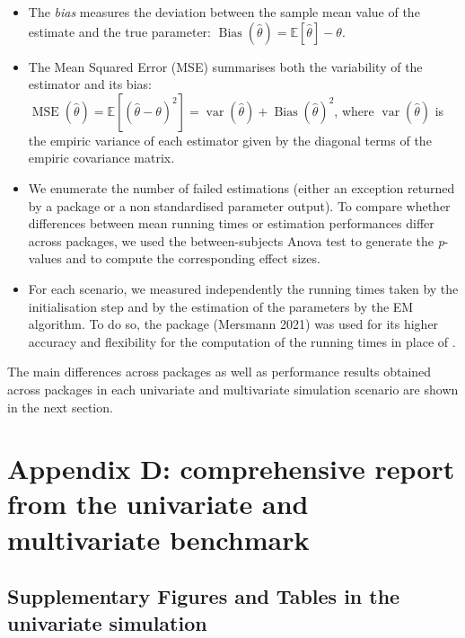 \begin{itemize}
\item
  The \emph{bias} measures the deviation between the sample mean value of the
  estimate and the true parameter:
  \(\operatorname{Bias}(\hat{\theta})=\mathbb{E} [\hat{\theta}] - \theta\).
\item
  The Mean Squared Error (MSE) summarises both the variability of the
  estimator and its bias: \(\operatorname{MSE} (\hat{\theta})=\mathbb{E} \left[ (\hat{\theta} - \theta)^2 \right] = \operatorname{var}(\hat{\theta}) + \operatorname{Bias}(\hat{\theta})^2\), where \(\operatorname{var}(\hat{\theta})\) is the empiric variance of each
  estimator given by the diagonal terms of the empiric covariance matrix.
\item
  We enumerate the number of failed estimations (either an exception returned by a package or a non standardised parameter output). To compare
  whether differences between mean running times or estimation
  performances differ across packages, we used the between-subjects Anova test  to generate
  the \emph{p}-values and  to compute the corresponding effect sizes.
\item
  For each scenario, we measured independently the running times taken by the
  initialisation step and by the estimation of the parameters by the EM
  algorithm. To do so, the  package
  (Mersmann 2021) was used for its higher accuracy and flexibility for
  the computation of the running times in place of .
\end{itemize}

The main differences across packages as well as performance results obtained across packages in each univariate and multivariate simulation scenario are shown in the next section.

\hypertarget{appendix-d-comprehensive-report-from-the-univariate-and-multivariate-benchmark}{%
\section{Appendix D: comprehensive report from the univariate and multivariate benchmark}\label{appendix-d-comprehensive-report-from-the-univariate-and-multivariate-benchmark}}

\hypertarget{supplementary-figures-and-tables-in-the-univariate-simulation}{%
\subsection{Supplementary Figures and Tables in the univariate simulation}\label{supplementary-figures-and-tables-in-the-univariate-simulation}}

